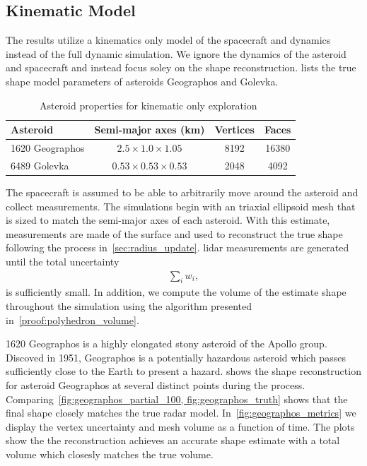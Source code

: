 \subsection{Kinematic Model}\label{sec:kinematic_exploration}
The results utilize a kinematics only model of the spacecraft and dynamics instead of the full dynamic simulation. 
We ignore the dynamics of the asteroid and spacecraft and instead focus soley on the shape reconstruction.
 lists the true shape model parameters of asteroids Geographos and Golevka.
\begin{table}[htbp]
    \centering
    \begin{tabular}{lccc}
        \toprule
        Asteroid & Semi-major axes (\si{\kilo\meter}) & Vertices & Faces\\
        \midrule
        \num{1620} Geographos & \( 2.5 \times 1.0 \times 1.05 \) & \num{8192} & \num{16380}  \\
        \num{6489} Golevka & \( 0.53 \times 0.53 \times 0.53 \)  & \num{2048} & \num{4092} \\
        \bottomrule
    \end{tabular} 
    \caption{Asteroid properties for kinematic only exploration~\label{tab:kinematic_asteroids}}
\end{table}
The spacecraft is assumed to be able to arbitrarily move around the asteroid and collect measurements.
The simulations begin with an triaxial ellipsoid mesh that is sized to match the semi-major axes of each asteroid.
With this estimate, measurements are made of the surface and used to reconstruct the true shape following the process in~\cref{sec:radius_update}.
\Gls{lidar} measurements are generated until the total uncertainty
\begin{align*}
    \sum_i w_i,
\end{align*}
is sufficiently small.
In addition, we compute the volume of the estimate shape throughout the simulation using the algorithm presented in~\cref{proof:polyhedron_volume}.

\num{1620} Geographos is a highly elongated stony asteroid of the Apollo group.
Discoved in \num{1951}, Geographos is a potentially hazardous asteroid which passes sufficiently close to the Earth to present a hazard.
 shows the shape reconstruction for asteroid Geographos at several distinct points during the process.
Comparing~\cref{fig:geographos_partial_100, fig:geographos_truth} shows that the final shape closely matches the true radar model.
In~\cref{fig:geographos_metrics} we display the vertex uncertainty and mesh volume as a function of time.
The plots show the the reconstruction achieves an accurate shape estimate with a total volume which closesly matches the true volume.

